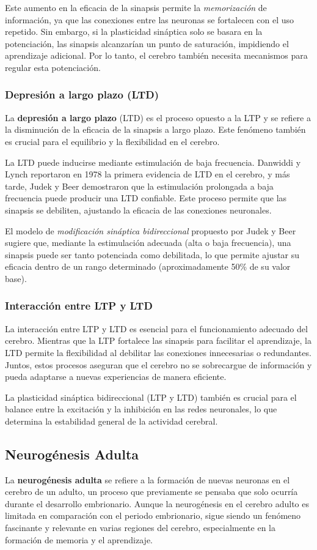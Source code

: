 \documentclass[12pt, letterpaper]{article}
\begin{document}
Este aumento en la eficacia de la sinapsis permite la \textit{memorización} de información, ya que las conexiones entre las neuronas se fortalecen con el uso repetido. Sin embargo, si la plasticidad sináptica solo se basara en la potenciación, las sinapsis alcanzarían un punto de saturación, impidiendo el aprendizaje adicional. Por lo tanto, el cerebro también necesita mecanismos para regular esta potenciación.

\subsubsection{Depresión a largo plazo (LTD)}
La \textbf{depresión a largo plazo} (LTD) es el proceso opuesto a la LTP y se refiere a la disminución de la eficacia de la sinapsis a largo plazo. Este fenómeno también es crucial para el equilibrio y la flexibilidad en el cerebro.

La LTD puede inducirse mediante estimulación de baja frecuencia. Danwiddi y Lynch reportaron en 1978 la primera evidencia de LTD en el cerebro, y más tarde, Judek y Beer demostraron que la estimulación prolongada a baja frecuencia puede producir una LTD confiable. Este proceso permite que las sinapsis se debiliten, ajustando la eficacia de las conexiones neuronales.

El modelo de \textit{modificación sináptica bidireccional} propuesto por Judek y Beer sugiere que, mediante la estimulación adecuada (alta o baja frecuencia), una sinapsis puede ser tanto potenciada como debilitada, lo que permite ajustar su eficacia dentro de un rango determinado (aproximadamente 50\% de su valor base).

\subsubsection{Interacción entre LTP y LTD}
La interacción entre LTP y LTD es esencial para el funcionamiento adecuado del cerebro. Mientras que la LTP fortalece las sinapsis para facilitar el aprendizaje, la LTD permite la flexibilidad al debilitar las conexiones innecesarias o redundantes. Juntos, estos procesos aseguran que el cerebro no se sobrecargue de información y pueda adaptarse a nuevas experiencias de manera eficiente.

La plasticidad sináptica bidireccional (LTP y LTD) también es crucial para el balance entre la excitación y la inhibición en las redes neuronales, lo que determina la estabilidad general de la actividad cerebral.

\subsection{Neurogénesis Adulta}
La \textbf{neurogénesis adulta} se refiere a la formación de nuevas neuronas en el cerebro de un adulto, un proceso que previamente se pensaba que solo ocurría durante el desarrollo embrionario. Aunque la neurogénesis en el cerebro adulto es limitada en comparación con el periodo embrionario, sigue siendo un fenómeno fascinante y relevante en varias regiones del cerebro, especialmente en la formación de memoria y el aprendizaje.
\end{document}
